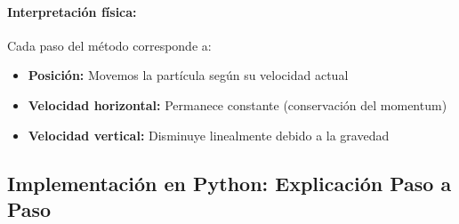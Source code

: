 \documentclass[12pt,a4paper]{article}
\begin{document}
\paragraph{Interpretación física:} Cada paso del método corresponde a:
\begin{itemize}
\item \textbf{Posición:} Movemos la partícula según su velocidad actual
\item \textbf{Velocidad horizontal:} Permanece constante (conservación del momentum)
\item \textbf{Velocidad vertical:} Disminuye linealmente debido a la gravedad
\end{itemize}

\subsection*{Implementación en Python: Explicación Paso a Paso}
\end{document}
